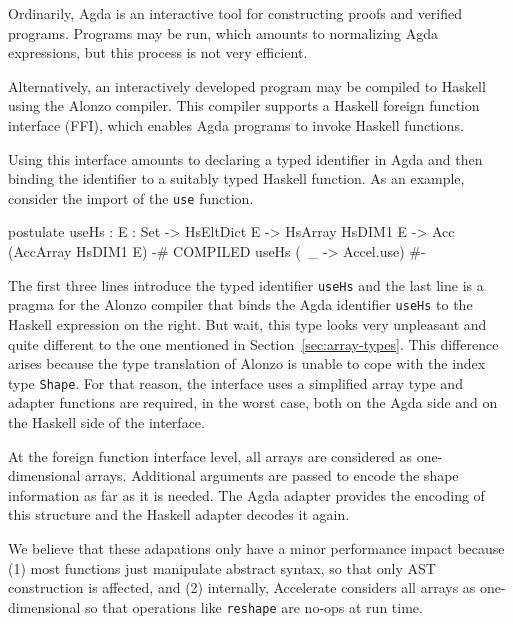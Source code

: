 \documentclass{llncs}
\begin{document}
Ordinarily, Agda is an interactive tool for constructing proofs and
verified programs. Programs may be run, which amounts to normalizing
Agda expressions, but this process is not very efficient.

Alternatively, an interactively developed program may be compiled to
Haskell using the Alonzo compiler. This compiler supports a Haskell
foreign function interface (FFI), which enables Agda programs to invoke
Haskell functions. 

Using this interface amounts to declaring a typed identifier in Agda
and then binding the identifier to a suitably typed Haskell
function. As an example, consider the import of the \texttt{use}
function.
\begin{code}
postulate 
  useHs : {E : Set}
      -> HsEltDict E -> HsArray HsDIM1 E -> Acc (AccArray HsDIM1 E)
  {-# COMPILED useHs       (\ _ -> Accel.use) #-}
\end{code}
The first three lines introduce the typed identifier \texttt{useHs}
and the last line is a pragma for the Alonzo compiler that binds the
Agda identifier \texttt{useHs} to the Haskell expression on the right.
But wait, this type looks very unpleasant and quite different to the
one mentioned in Section~\ref{sec:array-types}. This difference arises
because the type translation of Alonzo is unable to cope with the
index type \texttt{Shape}. For that reason, the interface uses a
simplified array type and adapter functions are required, in the worst
case, both on the Agda side and on the Haskell side of the interface.

At the foreign function interface level, all arrays are considered as
one-dimensional arrays. Additional arguments are passed to encode the
shape information as far as it is needed. The Agda adapter provides
the encoding of this structure and the Haskell adapter decodes it again. 

We believe that these adapations only have a minor performance impact
because (1) most functions just manipulate abstract syntax, so that
only AST construction is affected, and (2) internally, Accelerate
considers all arrays as one-dimensional so that operations like
\texttt{reshape} are no-ops at run time.
\end{document}
